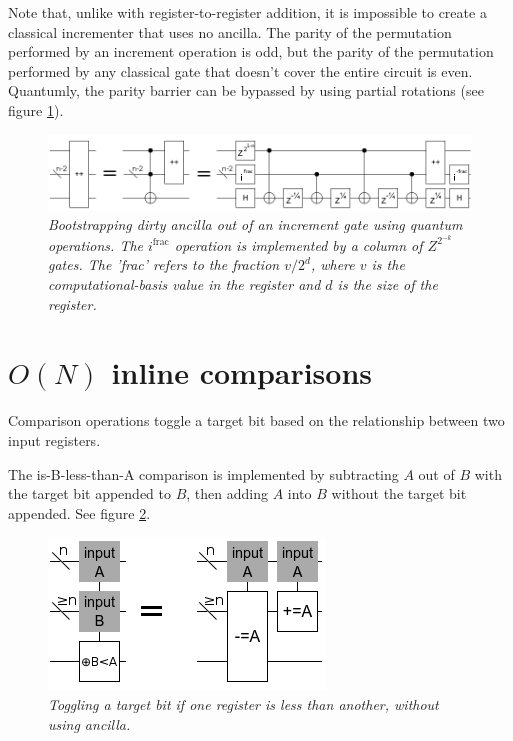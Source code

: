 \documentclass[twocolumn]{article}
\begin{document}
Note that, unlike with register-to-register addition, it is impossible to create a classical incrementer that uses no ancilla.
The parity of the permutation performed by an increment operation is odd, but the parity of the permutation performed by any classical gate that doesn't cover the entire circuit is even.
Quantumly, the parity barrier can be bypassed by using partial rotations (see figure \ref{fig:bootstrap-ancilla}).

\begin{figure}
  \centering
  \includegraphics[totalheight=1.4cm]{ancilla-bootstrap.png}
  \caption{\em Bootstrapping dirty ancilla out of an increment gate using quantum operations.
  The $i^{\text{frac}}$ operation is implemented by a column of $Z^{2^{-k}}$ gates.
  The 'frac' refers to the fraction $v/2^d$, where $v$ is the computational-basis value in the register and $d$ is the size of the register.}
  \label{fig:bootstrap-ancilla}
\end{figure}

\section{$O(N)$ inline comparisons}

Comparison operations toggle a target bit based on the relationship between two input registers.

The is-B-less-than-A comparison is implemented by subtracting $A$ out of $B$ with the target bit appended to $B$, then adding $A$ into $B$ without the target bit appended.
See figure \ref{fig:comparison-less}.

\begin{figure}
  \centering
  \includegraphics[totalheight=3cm]{comparison-less.png}
  \caption{\em Toggling a target bit if one register is less than another, without using ancilla.}
  \label{fig:comparison-less}
\end{figure}
\end{document}
